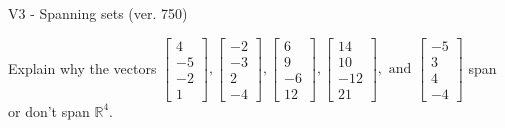 \begin{exercise}
  \begin{exerciseTitle}V3 - Spanning sets (ver. 750)\end{exerciseTitle}
  \begin{exerciseStatement}
    Explain why the vectors \(\left[\begin{array}{r}
4 \\
-5 \\
-2 \\
1
\end{array}\right] , \left[\begin{array}{r}
-2 \\
-3 \\
2 \\
-4
\end{array}\right] , \left[\begin{array}{r}
6 \\
9 \\
-6 \\
12
\end{array}\right] , \left[\begin{array}{r}
14 \\
10 \\
-12 \\
21
\end{array}\right] , \text{ and } \left[\begin{array}{r}
-5 \\
3 \\
4 \\
-4
\end{array}\right]\) span or don't span \(\mathbb{R}^4\). 
	



\end{exerciseStatement}
\end{exercise}
